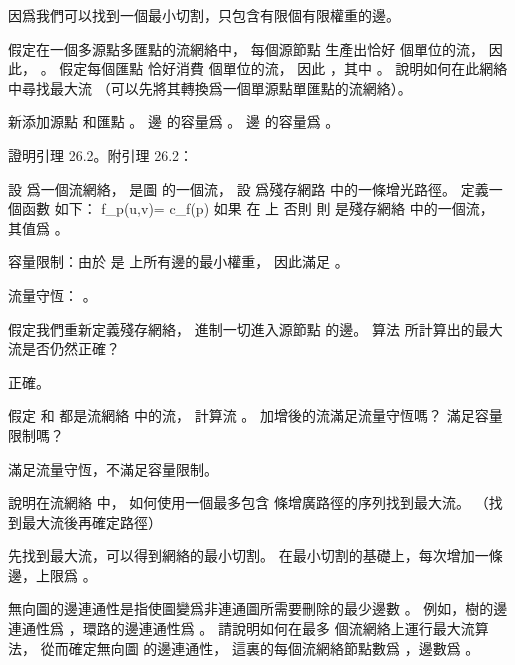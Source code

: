 \startANSWER
因爲我們可以找到一個最小切割，只包含有限個有限權重的邊。
\stopANSWER

\startEXERCISE
假定在一個多源點多匯點的流網絡中，
每個源節點  生產出恰好  個單位的流，
因此， 。
假定每個匯點  恰好消費  個單位的流，
因此 ，其中 。
說明如何在此網絡中尋找最大流  （可以先將其轉換爲一個單源點單匯點的流網絡）。
\stopEXERCISE

\startANSWER
新添加源點  和匯點 。
邊  的容量爲 。
邊  的容量爲 。
\stopANSWER

\startEXERCISE
證明引理 26.2。附引理 26.2：

設  爲一個流網絡，
  是圖  的一個流，
設  爲殘存網路  中的一條增光路徑。
定義一個函數  如下：
\startformula
f_p(u,v)=\startcases
\NC c_f(p) \NC 如果  在  上 \NR
{} \NC 否則 \NR
\stopcases
\stopformula
則  是殘存網絡  中的一個流，
其值爲 。
\stopEXERCISE

\startANSWER
容量限制：由於  是  上所有邊的最小權重，
因此滿足 。

流量守恆： 。
\stopANSWER

\startEXERCISE
假定我們重新定義殘存網絡，
進制一切進入源節點  的邊。
算法  所計算出的最大流是否仍然正確？
\stopEXERCISE

\startANSWER
正確。
\stopANSWER

\startEXERCISE
假定  和  都是流網絡  中的流，
計算流 。
加增後的流滿足流量守恆嗎？
滿足容量限制嗎？
\stopEXERCISE

\startANSWER
滿足流量守恆，不滿足容量限制。
\stopANSWER

\startEXERCISE
說明在流網絡  中，
如何使用一個最多包含  條增廣路徑的序列找到最大流。
（\hint 找到最大流後再確定路徑）
\stopEXERCISE

\startANSWER
先找到最大流，可以得到網絡的最小切割。
在最小切割的基礎上，每次增加一條邊，上限爲 。
\stopANSWER

\startEXERCISE
無向圖的{\EMP 邊連通性}是指使圖變爲非連通圖所需要刪除的最少邊數 。
例如，樹的邊連通性爲 ，環路的邊連通性爲 。
請說明如何在最多  個流網絡上運行最大流算法，
從而確定無向圖  的邊連通性，
這裏的每個流網絡節點數爲 ，邊數爲 。
\stopEXERCISE

